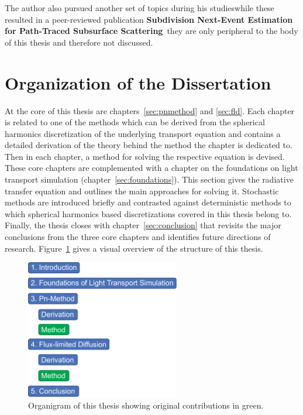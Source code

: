 The author also pursued another set of topics during his studies\mydash while these resulted in a peer-reviewed publication \textbf{Subdivision Next-Event Estimation for Path-Traced Subsurface Scattering}~\cite{Koerner16}\mydash they are only peripheral to the body of this thesis and therefore not discussed.

\section{Organization of the Dissertation}

At the core of this thesis are chapters~\ref{sec:pnmethod} and \ref{sec:fld}. Each chapter is related to one of the methods which can be derived from the spherical harmonics discretization of the underlying transport equation and contains a detailed derivation of the theory behind the method the chapter is dedicated to. Then in each chapter, a method for solving the respective equation is devised. These core chapters are complemented with a chapter on the foundations on light transport simulation (chapter~\ref{sec:foundations}). This section gives the radiative transfer equation and outlines the main approaches for solving it. Stochastic methods are introduced briefly and contrasted against deterministic methods to which spherical harmonics based discretizations covered in this thesis belong to. Finally, the thesis closes with chapter~\ref{sec:conclusion} that revisits the major conclusions from the three core chapters and identifies future directions of research. Figure~\ref{fig:intro_organization} gives a visual overview of the structure of this thesis.
\begin{figure}[ht]
\hspace{0.1\columnwidth}
\includegraphics[width=0.6\textwidth]{02_Introduction/figures/fig_organigram.pdf}
\caption{Organigram of this thesis showing original contributions in green.}
\label{fig:intro_organization}
\end{figure}








